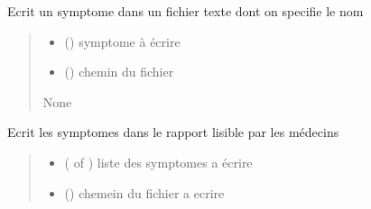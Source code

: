 \documentclass[letterpaper,10pt,english]{sphinxmanual}
\begin{document}
\begin{fulllineitems}
\label{\detokenize{frise:frise.ecriture_fichier.EcrireSymptome}}
\pysigstartsignatures
{}
\pysigstopsignatures
\sphinxAtStartPar
Ecrit un symptome dans un fichier texte dont on specifie le nom
\begin{quote}\begin{description}
\begin{itemize}
\item {} 
\sphinxAtStartPar
{} () \textendash{} symptome à écrire

\item {} 
\sphinxAtStartPar
{} () \textendash{} chemin du fichier

\end{itemize}

\sphinxAtStartPar
None

\end{description}\end{quote}

\end{fulllineitems}


\begin{fulllineitems}
\label{\detokenize{frise:frise.ecriture_fichier.ecrire_rapport}}
\pysigstartsignatures
{}
\pysigstopsignatures
\sphinxAtStartPar
Ecrit les symptomes dans le rapport lisible par les médecins
\begin{quote}\begin{description}
\begin{itemize}
\item {} 
\sphinxAtStartPar
{} ( of ) \textendash{} liste des symptomes a écrire

\item {} 
\sphinxAtStartPar
{} () \textendash{} chemein du fichier a ecrire

\end{itemize}

\end{description}\end{quote}

\end{fulllineitems}
\end{document}
